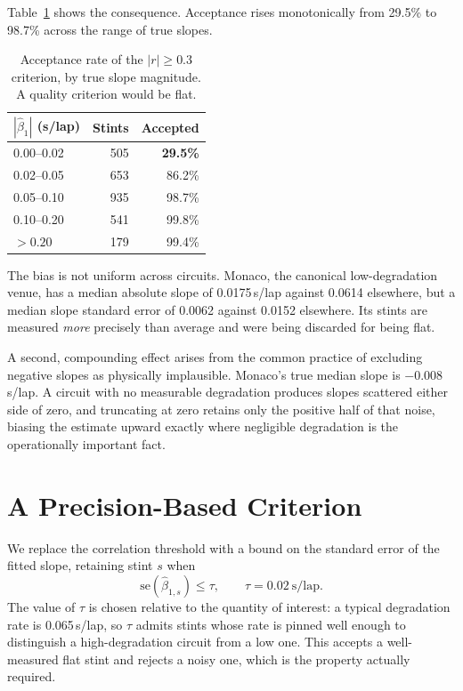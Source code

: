 \documentclass[conference]{IEEEtran}
\begin{document}
Table~\ref{tab:passrate} shows the consequence. Acceptance rises monotonically
from 29.5\% to 98.7\% across the range of true slopes.

\begin{table}[t]
\caption{Acceptance rate of the $|r| \geq 0.3$ criterion, by true slope
magnitude. A quality criterion would be flat.}
\label{tab:passrate}
\centering
\begin{tabular}{lrr}
\toprule
$|\hat{\beta}_1|$ (s/lap) & Stints & Accepted \\
\midrule
0.00--0.02 & 505 & \textbf{29.5\%} \\
0.02--0.05 & 653 & 86.2\% \\
0.05--0.10 & 935 & 98.7\% \\
0.10--0.20 & 541 & 99.8\% \\
$>0.20$    & 179 & 99.4\% \\
\bottomrule
\end{tabular}
\end{table}

The bias is not uniform across circuits. Monaco, the canonical
low-degradation venue, has a median absolute slope of 0.0175\,s/lap against
0.0614 elsewhere, but a median slope standard error of 0.0062 against 0.0152
elsewhere. Its stints are measured \emph{more} precisely than average and were
being discarded for being flat.

A second, compounding effect arises from the common practice of excluding
negative slopes as physically implausible. Monaco's true median slope is
$-0.008$\,s/lap. A circuit with no measurable degradation produces slopes
scattered either side of zero, and truncating at zero retains only the positive
half of that noise, biasing the estimate upward exactly where negligible
degradation is the operationally important fact.

\section{A Precision-Based Criterion}
\label{sec:fix}

We replace the correlation threshold with a bound on the standard error of the
fitted slope, retaining stint $s$ when
\begin{equation}
\mathrm{se}(\hat{\beta}_{1,s}) \leq \tau, \qquad \tau = 0.02\ \text{s/lap}.
\end{equation}
The value of $\tau$ is chosen relative to the quantity of interest: a typical
degradation rate is 0.065\,s/lap, so $\tau$ admits stints whose rate is pinned
well enough to distinguish a high-degradation circuit from a low one. This
accepts a well-measured flat stint and rejects a noisy one, which is the
property actually required.
\end{document}
